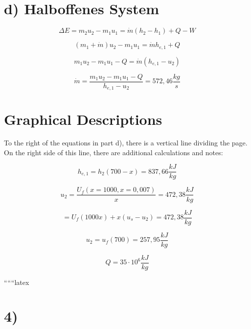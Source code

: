 \section*{d) Halboffenes System}

\[
\Delta E = m_2 u_2 - m_1 u_1 = \dot{m} (h_2 - h_1) + Q - W
\]

\[
(m_1 + \dot{m}) u_2 - m_1 u_1 = \dot{m} h_{e,1} + Q
\]

\[
m_1 u_2 - m_1 u_1 - Q = \dot{m} (h_{e,1} - u_2)
\]

\[
\dot{m} = \frac{m_1 u_2 - m_1 u_1 - Q}{h_{e,1} - u_2} = 572,46 \frac{kg}{s}
\]

\section*{Graphical Descriptions}

To the right of the equations in part d), there is a vertical line dividing the page. On the right side of this line, there are additional calculations and notes:

\[
h_{e,1} = h_2 (700 - x) = 837,66 \frac{kJ}{kg}
\]

\[
u_2 = \frac{U_f (x = 1000, x = 0,007)}{x} = 472,38 \frac{kJ}{kg}
\]

\[
= U_f (1000 x) + x (u_s - u_2) = 472,38 \frac{kJ}{kg}
\]

\[
u_2 = u_f (700) = 257,95 \frac{kJ}{kg}
\]

\[
Q = 35 \cdot 10^6 \frac{kJ}{kg}
\]

``````latex

\section*{4)}
